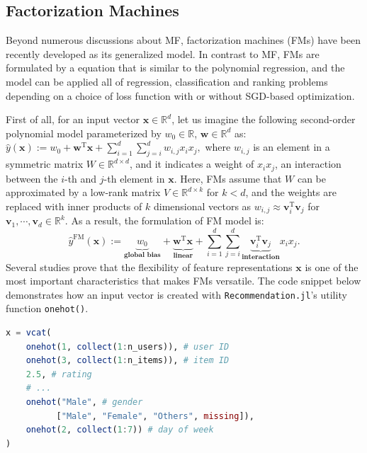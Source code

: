 \subsection{Factorization Machines}

Beyond numerous discussions about MF, factorization machines (FMs) have been recently developed as its generalized model. In contrast to MF, FMs are formulated by a equation that is similar to the polynomial regression, and the model can be applied all of regression, classification and ranking problems depending on a choice of loss function with or without SGD-based optimization.

First of all, for an input vector $\mathbf{x} \in \mathbb{R}^d$, let us imagine the following second-order polynomial model parameterized by $w_0 \in \mathbb{R}$, $\mathbf{w} \in \mathbb{R}^d$ as: $\hat{y}(\mathbf{x}) := w_0 + \mathbf{w}^{\mathrm{T}} \mathbf{x} + \sum_{i=1}^d \sum_{j=i}^d w_{i,j} x_i x_j,$ where $w_{i,j}$ is an element in a symmetric matrix $W \in \mathbb{R}^{d \times d}$, and it indicates a weight of $x_i x_j$, an interaction between the $i$-th and $j$-th element in $\mathbf{x}$. Here, FMs assume that $W$ can be approximated by a low-rank matrix $V \in \mathbb{R}^{d \times k}$ for $k < d$, and the weights are replaced with inner products of $k$ dimensional vectors as $w_{i, j} \approx \mathbf{v}_i^{\mathrm{T}} \mathbf{v}_j$ for $\mathbf{v}_1, \cdots, \mathbf{v}_d \in \mathbb{R}^k$. As a result, the formulation of FM model is:
\begin{equation}
\hat{y}^{\mathrm{FM}}(\mathbf{x}) := \underbrace{w_0}_{\textbf{global bias}} + \underbrace{\mathbf{w}^{\mathrm{T}} \mathbf{x}_{ }}_{\textbf{linear}} + \sum_{i=1}^d \sum_{j=i}^d \underbrace{\mathbf{v}_i^{\mathrm{T}} \mathbf{v}_j}_{\textbf{interaction}} x_i x_j.
\label{eq:FMs}
\end{equation}
Several studies \cite{Geuens2015,Rendle2012-1,Rendle2012-3} prove that the flexibility of feature representations $\mathbf{x}$ is one of the most important characteristics that makes FMs versatile. The code snippet below demonstrates how an input vector is created with \texttt{Recommendation.jl}'s utility function \texttt{onehot()}.

\begin{lstlisting}[language = Julia]
x = vcat(
    onehot(1, collect(1:n_users)), # user ID
    onehot(3, collect(1:n_items)), # item ID
    2.5, # rating
    # ...
    onehot("Male", # gender
          ["Male", "Female", "Others", missing]),
    onehot(2, collect(1:7)) # day of week
)
\end{lstlisting}

